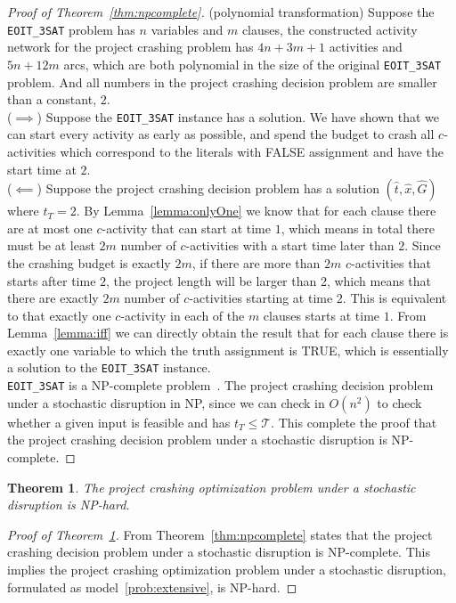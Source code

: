 \documentclass[11pt]{article}
\newtheorem{theorem}{Theorem}
\begin{document}
		\begin{proof}[Proof of Theorem~\ref{thm:npcomplete}]
			(polynomial transformation) 
			Suppose the \verb|EOIT_3SAT| problem has \(n\) variables and \(m\) clauses, the constructed activity network for the project crashing problem has \(4n + 3m + 1\) activities and \(5n + 12m\) arcs, which are both polynomial in the size of the original \verb|EOIT_3SAT| problem. And all numbers in the project crashing decision problem are smaller than a constant, \(2\).\\
			(\(\implies\)) Suppose the \verb|EOIT_3SAT| instance has a solution. We have shown that we can start every activity as early as possible, and spend the budget to crash all \(c\)-activities which correspond to the literals with FALSE assignment and have the start time at \(2\). \\
			(\(\impliedby\)) Suppose the project crashing decision problem has a solution \((\hat{t},\hat{x},\hat{G})\) where \(t_T = 2\). By Lemma~\ref{lemma:onlyOne} we know that for each clause there are at most one \(c\)-activity that can start at time \(1\), which means in total there must be at least \(2m\) number of \(c\)-activities with a start time later than \(2\). Since the crashing budget is exactly \(2m\), if there are more than \(2m\) \(c\)-activities that starts after time \(2\), the project length will be larger than 2, which means that there are exactly \(2m\) number of \(c\)-activities starting at time \(2\). This is equivalent to that exactly one \(c\)-activity in each of the \(m\) clauses starts at time \(1\). From Lemma~\ref{lemma:iff} we can directly obtain the result that for each clause there is exactly one variable to which the truth assignment is TRUE, which is essentially a solution to the \verb|EOIT_3SAT| instance.\\
			\newline
			\verb|EOIT_3SAT| is a NP-complete problem~\cite{Garey1979ComputersAI}. The project crashing decision problem under a stochastic disruption in NP, since we can check in \(O(n^2)\) to check whether a given input is feasible and has \(t_T \leq \mathcal{T}\). This complete the proof that the project crashing decision problem under a stochastic disruption is NP-complete.
		\end{proof}
		\begin{theorem} \label{thm:nphard}
			The project crashing optimization problem under a stochastic disruption is NP-hard.
		\end{theorem}
		\begin{proof}[Proof of Theorem~\ref{thm:nphard}]
			From Theorem~\ref{thm:npcomplete} states that the project crashing decision problem under a stochastic disruption is NP-complete. This implies the project crashing optimization problem under a stochastic disruption, formulated as model~\ref{prob:extensive}, is NP-hard.
		\end{proof}
	
\end{document}
